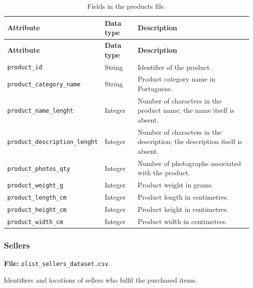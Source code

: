 \documentclass[a4paper,12pt]{article}
\newcommand{\tablestyle}{%
  \small\setstretch{1.05}%
  \renewcommand{\arraystretch}{1.25}%
  \setlength{\extrarowheight}{3pt}%
  \arrayrulecolor{tableborder}%
}
\begin{document}
{\tablestyle
\begin{longtable}{|L{5.7cm}|L{2.1cm}|L{\dimexpr\textwidth-7.8cm-6\arrayrulewidth\relax}|}
  \caption{Fields in the products file.}
  \label{tab:dataset-5}\\
  \hline
  \textbf{Attribute} & \textbf{Data type} & \textbf{Description} \\[3pt]\hline
  \endfirsthead
  \hline
  \textbf{Attribute} & \textbf{Data type} & \textbf{Description} \\[3pt]\hline
  \endhead
  \endfoot
  \endlastfoot
  \nolinkurl{product_id} & String & Identifier of the product. \\[3pt]\hline
  \nolinkurl{product_category_name} & String & Product category name in Portuguese. \\[3pt]\hline
  \nolinkurl{product_name_lenght} & Integer & Number of characters in the product name; the name itself is absent. \\[3pt]\hline
  \nolinkurl{product_description_lenght} & Integer & Number of characters in the description; the description itself is absent. \\[3pt]\hline
  \nolinkurl{product_photos_qty} & Integer & Number of photographs associated with the product. \\[3pt]\hline
  \nolinkurl{product_weight_g} & Integer & Product weight in grams. \\[3pt]\hline
  \nolinkurl{product_length_cm} & Integer & Product length in centimetres. \\[3pt]\hline
  \nolinkurl{product_height_cm} & Integer & Product height in centimetres. \\[3pt]\hline
  \nolinkurl{product_width_cm} & Integer & Product width in centimetres. \\[3pt]\hline
\end{longtable}
}

\subsubsection{Sellers}

\textbf{File:} \nolinkurl{olist_sellers_dataset.csv}.

Identifiers and locations of sellers who fulfil the purchased items.
\end{document}
